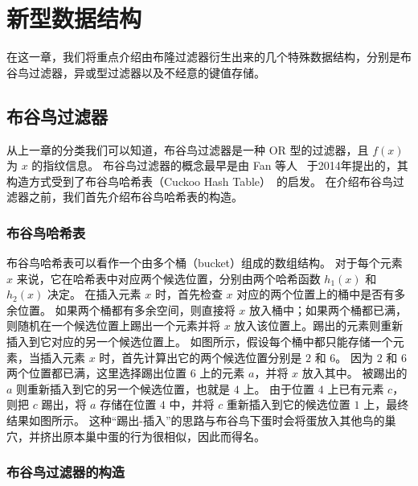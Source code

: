 
\chapter{新型数据结构}

在这一章，我们将重点介绍由布隆过滤器衍生出来的几个特殊数据结构，分别是布谷鸟过滤器，异或型过滤器以及不经意的键值存储。

\section{布谷鸟过滤器}

从上一章的分类我们可以知道，布谷鸟过滤器是一种 OR 型的过滤器，且 $f(x)$ 为 $x$ 的指纹信息。
布谷鸟过滤器的概念最早是由 Fan 等人~\cite{fan2014cuckoo} 于2014年提出的，其构造方式受到了布谷鸟哈希表（Cuckoo Hash Table）~\cite{pagh2004cuckoo}的启发。
在介绍布谷鸟过滤器之前，我们首先介绍布谷鸟哈希表的构造。

\subsection{布谷鸟哈希表}

布谷鸟哈希表可以看作一个由多个桶（bucket）组成的数组结构。
对于每个元素 $x$ 来说，它在哈希表中对应两个候选位置，分别由两个哈希函数 $h_1(x)$ 和 $h_2(x)$ 决定。
在插入元素 $x$ 时，首先检查 $x$ 对应的两个位置上的桶中是否有多余位置。
如果两个桶都有多余空间，则直接将 $x$ 放入桶中；如果两个桶都已满，则随机在一个候选位置上踢出一个元素并将 $x$ 放入该位置上。踢出的元素则重新插入到它对应的另一个候选位置上。
如图所示，假设每个桶中都只能存储一个元素，当插入元素 $x$ 时，首先计算出它的两个候选位置分别是 $2$ 和 $6$。
因为 $2$ 和 $6$ 两个位置都已满，这里选择踢出位置 $6$ 上的元素 $a$，并将 $x$ 放入其中。
被踢出的 $a$ 则重新插入到它的另一个候选位置，也就是 $4$ 上。
由于位置 $4$ 上已有元素 $c$，则把 $c$ 踢出，将 $a$ 存储在位置 $4$ 中，并将 $c$ 重新插入到它的候选位置 $1$ 上，最终结果如图所示。
这种``踢出-插入''的思路与布谷鸟下蛋时会将蛋放入其他鸟的巢穴，并挤出原本巢中蛋的行为很相似，因此而得名。

\subsection{布谷鸟过滤器的构造}

